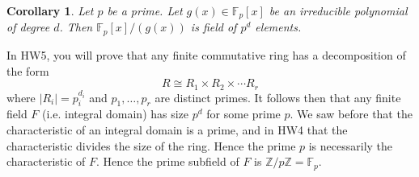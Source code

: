 \documentclass{article}
\def\Z{{\mathbb Z}}
\def\F{{\mathbb F}}
\def\Z{{\mathbb Z}}
\def\F{{\mathbb F}}
\newtheorem{cor}[subsection]{Corollary}
\begin{document}
\begin{cor}
    Let $p$ be a prime. Let $g(x)\in\F_p[x]$ be an irreducible polynomial of degree $d$. Then $\F_p[x]/(g(x))$ is field of $p^d$ elements.
\end{cor}

In HW5, you will prove that any finite commutative ring has a decomposition of the form $$R\cong R_1\times R_2\times\cdots R_r$$ 
where $|R_i| = p_i^{d_i}$ and $p_1,\ldots,p_r$ are distinct primes. It follows then that any finite field $F$ (i.e. integral domain) has size $p^d$ for some prime $p$. We saw before that the characteristic of an integral domain is a prime, and in HW4 that the characteristic divides the size of the ring. Hence the prime $p$ is necessarily the characteristic of $F$. Hence the prime subfield of $F$ is $\Z/p\Z = \F_p$.
\end{document}
